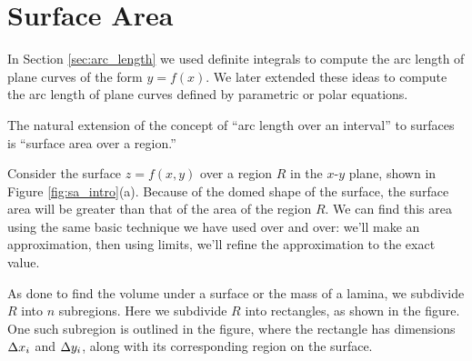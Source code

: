 \section{Surface Area}\label{sec:surface_area}

In Section \ref{sec:arc_length} we used definite integrals to compute the arc length of plane curves of the form $y=f(x)$. We later extended these ideas to compute the arc length of plane curves defined by parametric or polar equations. 

The natural extension of the concept of ``arc length over an interval'' to surfaces is ``surface area over a region.'' 

Consider the surface $z=f(x,y)$ over a region $R$ in the $x$-$y$ plane, shown in Figure \ref{fig:sa_intro}(a). Because of the domed shape of the surface, the surface area will be greater than that of the area of the region $R$. We can find this area using the same basic technique we have used over and over: we'll make an approximation, then using limits, we'll refine the approximation to the exact value.

As done to find the volume under a surface or the mass of a lamina, we subdivide $R$ into $n$ subregions. Here we subdivide $R$ into rectangles, as shown in the figure. One such subregion is outlined in the figure, where the rectangle has dimensions $\Delta x_i$ and $\Delta y_i$, along with its corresponding region on the surface.

